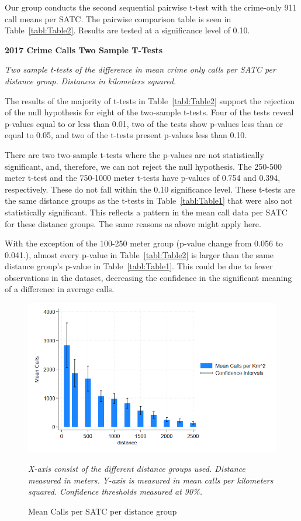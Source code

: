 \documentclass[12pt]{article}
\begin{document}
Our group conducts the second sequential pairwise t-test with the crime-only 911 call means per SATC. The pairwise comparison table is seen in Table~\ref{tabl:Table2}. Results are tested at a significance level of 0.10. 


\begin{table}[hb!]
\begin{center}

\end{center}


\caption{\bf{2017 Crime Calls Two Sample T-Tests}}
\label{tabl:Table2}
\centering\textit{Two sample t-tests of the difference in mean crime only calls per SATC per distance group.}
\textit{Distances in kilometers squared.}
\end{table}


The results of the majority of t-tests in Table~\ref{tabl:Table2} support the rejection of the null hypothesis for eight of the two-sample t-tests. Four of the tests reveal p-values equal to or less than 0.01, two of the tests show p-values less than or equal to 0.05, and two of the t-tests present p-values less than 0.10. 

There are two two-sample t-tests where the p-values are not statistically significant, and, therefore, we can not reject the null hypothesis. The 250-500 meter t-test and the 750-1000 meter t-tests have p-values of 0.754 and 0.394, respectively. These do not fall within the 0.10 significance level. These t-tests are the same distance groups as the t-tests in Table~\ref{tabl:Table1} that were also not statistically significant. This reflects a pattern in the mean call data per SATC for these distance groups. The same reasons as above might apply here.

With the exception of the 100-250 meter group (p-value change from 0.056 to 0.041.), almost every p-value in Table~\ref{tabl:Table2} is larger than the same distance group's p-value in Table~\ref{tabl:Table1}. This could be due to fewer observations in the dataset, decreasing the confidence in the significant meaning of a difference in average calls. 

\begin{figure}[htbp]
    \centering
\includegraphics[width=0.75\linewidth]{Reproducibility Package/Visual Graphics/CI_Graph.png}
    \caption{Mean Calls per SATC per distance group}
    \label{fig:Figure3}
     \textit{X-axis consist of the different distance groups used. Distance measured in meters.}
    \textit{Y-axis is measured in mean calls per kilometers squared.}
    \textit{Confidence thresholds measured at 90\%.}
\end{figure}
\end{document}

